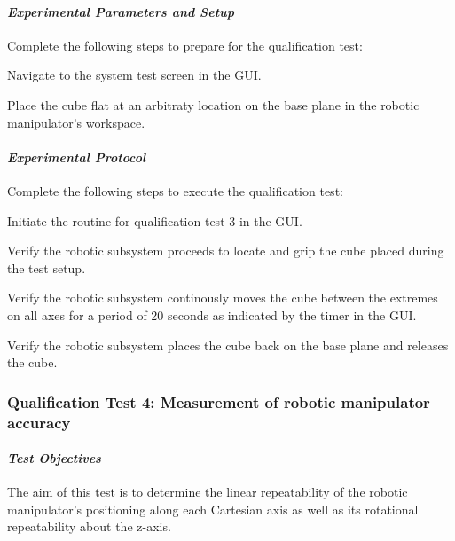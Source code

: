 \paragraph{\textit{Experimental Parameters and Setup}} 

Complete the following steps to prepare for the qualification test:

\begin{compactenum}
	\item Navigate to the system test screen in the GUI.
	\item Place the cube flat at an arbitraty location on the base plane in the robotic manipulator's workspace.
\end{compactenum}

\paragraph{\textit{Experimental Protocol}}

Complete the following steps to execute the qualification test:

\begin{compactenum}
	\item Initiate the routine for qualification test 3 in the GUI.
	\item Verify the robotic subsystem proceeds to locate and grip the cube placed during the test setup.
	\item Verify the robotic subsystem continously moves the cube between the extremes on all axes for a period of 20 seconds as indicated by the timer in the GUI.
	\item Verify the robotic subsystem places the cube back on the base plane and releases the cube.
\end{compactenum}

\subsubsection{Qualification Test 4: Measurement of robotic manipulator accuracy}

\paragraph{\textit{Test Objectives}}

The aim of this test is to determine the linear repeatability of the robotic manipulator's positioning along each Cartesian axis as well as its rotational repeatability about the z-axis.


